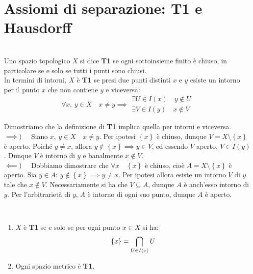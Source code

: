 \section{Assiomi di separazione: T1 e Hausdorff}
\begin{define}[Spazio T1.]~{}\label{T1}\\
Uno spazio topologico $X$ si dice \textbf{T1} se ogni sottoinsieme finito è chiuso, in particolare se e solo se tutti i punti sono chiusi.\\
In termini di intorni, $X$ è \textbf{T1} se presi due punti distinti $x$ e $y$ esiste un intorno per il punto $x$ che non contiene $y$ e viceversa:
\begin{equation}
\forall x,\ y\in X\quad x\neq y\implies
\begin{array}{l}
	\exists U\in I\left(x\right)\quad y\notin U\\
	\exists V\in I\left(y\right)\quad x\notin V
\end{array}
\end{equation}
\vspace{-6mm}
\end{define}
\begin{demonstration} Dimostriamo che la definizione di \textbf{T1} implica quella per intorni e viceversa.\\
$\implies)\quad$ Siano $x,\ y\in X\quad x\neq y$. Per ipotesi $\left\{x\right\}$ è chiuso, dunque $V=X\setminus\left\{x\right\}$ è aperto. Poiché $y\neq x$, allora $y\notin\left\{x\right\}\implies y\in V$, ed essendo $V$ aperto, $V\in I\left(y\right)$. Dunque $V$ è intorno di $y$ e banalmente $x\notin V$.\\
$\impliedby)\quad$ Dobbiamo dimostrare che $\forall x\quad \left\{x\right\}$ è chiuso, cioè $A=X\setminus\left\{x\right\}$ è aperto. Sia $y\in A$: $y\notin \left\{x\right\}\implies y\neq x$. Per ipotesi allora esiste un intorno $V$ di $y$ tale che $x\notin V$. Necessariamente si ha che $V\subseteq A$, dunque $A$ è anch'esso intorno di $y$. Per l'arbitrarietà di $y$, $A$ è intorno di ogni suo punto, dunque $A$ è aperto.
\end{demonstration}
\begin{observes}~{}
\begin{enumerate}
\item $X$ è \textbf{T1} se e solo se per ogni punto $x\in X$ si ha:
\begin{equation}
\left\{x\right\}=\mathop{{\bigcap}}\displaylimits_{U\in I\left(x\right)}U
\end{equation}
\item Ogni spazio metrico è \textbf{T1}.
\end{enumerate}
\vspace{-3mm}
\end{observes}
